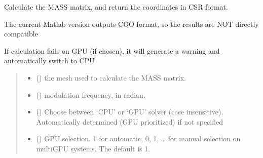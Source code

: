 \documentclass[letterpaper,10pt,english]{sphinxmanual}
\begin{document}
\begin{fulllineitems}
\label{\detokenize{_autosummary/nirfasterff.math.gen_mass_matrix:nirfasterff.math.gen_mass_matrix}}
\pysigstartsignatures
{}
\pysigstopsignatures
\sphinxAtStartPar
Calculate the MASS matrix, and return the coordinates in CSR format.

\sphinxAtStartPar
The current Matlab version outputs COO format, so the results are NOT directly compatible

\sphinxAtStartPar
If calculation fails on GPU (if chosen), it will generate a warning and automatically switch to CPU
\begin{quote}\begin{description}
\begin{itemize}
\item {} 
\sphinxAtStartPar
{} () \textendash{} the mesh used to calculate the MASS matrix.

\item {} 
\sphinxAtStartPar
{} () \textendash{} modulation frequency, in radian.

\item {} 
\sphinxAtStartPar
{} (\sphinxstyleliteralemphasis{\sphinxupquote{, }}) \textendash{} Choose between ‘CPU’ or ‘GPU’ solver (case insensitive). Automatically determined (GPU prioritized) if not specified

\item {} 
\sphinxAtStartPar
{} (\sphinxstyleliteralemphasis{\sphinxupquote{, }}) \textendash{} GPU selection. \sphinxhyphen{}1 for automatic, 0, 1, … for manual selection on multi\sphinxhyphen{}GPU systems. The default is \sphinxhyphen{}1.


\end{itemize}
\end{description}
\end{quote}
\end{fulllineitems}
\end{document}
